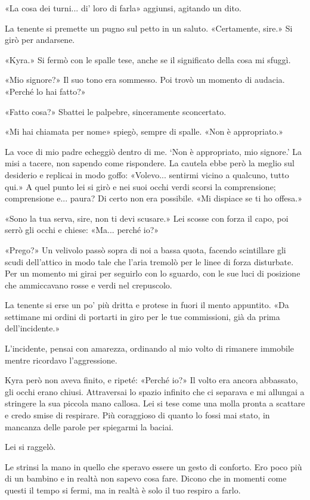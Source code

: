 «La cosa dei turni... di' loro di farla» aggiunsi, agitando un dito.

La tenente si premette un pugno sul petto in un saluto. «Certamente,
sire.» Si girò per andarsene.

«Kyra.» Si fermò con le spalle tese, anche se il significato della cosa
mi sfuggì.

«Mio signore?» Il suo tono era sommesso. Poi trovò un momento di
audacia. «Perché lo hai fatto?»

«Fatto cosa?» Sbattei le palpebre, sinceramente sconcertato.

«Mi hai chiamata per nome» spiegò, sempre di spalle. «Non è
appropriato.»

La voce di mio padre echeggiò dentro di me. `Non è appropriato, mio
signore.' La misi a tacere, non sapendo come rispondere. La cautela ebbe
però la meglio sul desiderio e replicai in modo goffo: «Volevo...
sentirmi vicino a qualcuno, tutto qui.» A quel punto lei si girò e nei
suoi occhi verdi scorsi la comprensione; comprensione e... paura? Di
certo non era possibile. «Mi dispiace se ti ho offesa.»

«Sono la tua serva, sire, non ti devi scusare.» Lei scosse con forza il
capo, poi serrò gli occhi e chiese: «Ma... perché io?»

«Prego?» Un velivolo passò sopra di noi a bassa quota, facendo
scintillare gli scudi dell'attico in modo tale che l'aria tremolò per le
linee di forza disturbate. Per un momento mi girai per seguirlo con lo
sguardo, con le sue luci di posizione che ammiccavano rosse e verdi nel
crepuscolo.

La tenente si erse un po' più dritta e protese in fuori il mento
appuntito. «Da settimane mi ordini di portarti in giro per le tue
commissioni, già da prima dell'incidente.»

L'incidente, pensai con amarezza, ordinando al mio volto di rimanere
immobile mentre ricordavo l'aggressione.

Kyra però non aveva finito, e ripeté: «Perché io?» Il volto era ancora
abbassato, gli occhi erano chiusi. Attraversai lo spazio infinito che ci
separava e mi allungai a stringere la sua piccola mano callosa. Lei si
tese come una molla pronta a scattare e credo smise di respirare. Più
coraggioso di quanto lo fossi mai stato, in mancanza delle parole per
spiegarmi la baciai.

Lei si raggelò.

Le strinsi la mano in quello che speravo essere un gesto di conforto.
Ero poco più di un bambino e in realtà non sapevo cosa fare. Dicono che
in momenti come questi il tempo si fermi, ma in realtà è solo il tuo
respiro a farlo.

